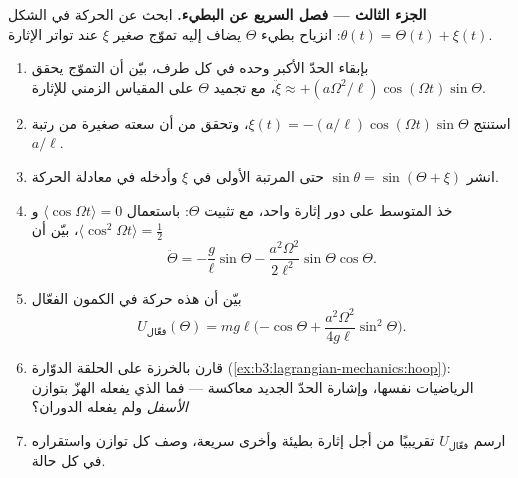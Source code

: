 \begin{problem}
\medskip\noindent\textbf{الجزء الثالث --- فصل السريع عن البطيء.}
ابحث عن الحركة في الشكل $\theta(t) = \Theta(t) + \xi(t)$: انزياح
بطيء $\Theta$ يضاف إليه تموّج صغير $\xi$ عند تواتر الإثارة.
\begin{enumerate}[resume]
  \item بإبقاء الحدّ الأكبر وحده في كل طرف، بيّن أن التموّج يحقق
        $\ddot\xi \approx +(a\Omega^2/\ell)\cos(\Omega t)
        \sin\Theta$، مع تجميد $\Theta$ على المقياس الزمني للإثارة.
  \item استنتج $\xi(t) = -(a/\ell)\cos(\Omega t)\sin\Theta$، وتحقق
        من أن سعته صغيرة من رتبة $a/\ell$.
  \item انشر $\sin\theta = \sin(\Theta + \xi)$ حتى المرتبة الأولى في
        $\xi$ وأدخله في معادلة الحركة.
  \item خذ المتوسط على دور إثارة واحد، مع تثبيت $\Theta$:
        باستعمال $\langle\cos\Omega t\rangle = 0$ و
        $\langle\cos^2\Omega t\rangle = \tfrac12$، بيّن أن
        \[
        \ddot\Theta = -\frac{g}{\ell}\sin\Theta
         - \frac{a^2\Omega^2}{2\ell^2}\sin\Theta\cos\Theta .
        \]
  \item بيّن أن هذه حركة في الكمون الفعّال
        \[
        U_{\text{فعّال}}(\Theta) = mg\ell\Big({-\cos\Theta}
         + \frac{a^2\Omega^2}{4g\ell}\sin^2\Theta\Big) .
        \]
  \item قارن بالخرزة على الحلقة الدوّارة
        (\cref{ex:b3:lagrangian-mechanics:hoop}): الرياضيات نفسها،
        وإشارة الحدّ الجديد معاكسة --- فما الذي يفعله الهزّ بتوازن
        \emph{الأسفل} ولم يفعله الدوران؟
  \item ارسم $U_{\text{فعّال}}$ تقريبيًا من أجل إثارة بطيئة وأخرى
        سريعة، وصف كل توازن واستقراره في كل حالة.
\end{enumerate}


\end{problem}
